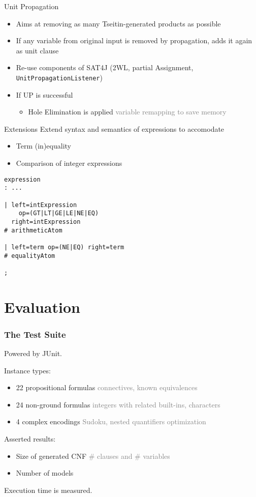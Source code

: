 \documentclass[smaller,dvipsnames,ratio=169]{beamer}
\begin{document}
  \begin{frame}{Unit Propagation}
    \begin{itemize}
      \item Aims at removing as many Tseitin-generated products as possible
      \item If any variable from original input is removed by propagation, adds it again as unit clause
      \item Re-use components of SAT4J (2WL, partial Assignment, \texttt{UnitPropagationListener})
      \item If UP is successful
       \begin{itemize}
       	\item  \alert{Hole Elimination} is applied \textcolor{gray}{variable remapping to save memory}
       \end{itemize}
        
    \end{itemize}
  \end{frame}
  
  \begin{frame}[fragile]{Extensions}
    Extend syntax and semantics of expressions to accomodate
    \begin{itemize}
      \item Term (in)\alert{equality}
      \item \alert{Comparison} of integer expressions
    \end{itemize}
    \begin{verbatim}
expression
: ...

| left=intExpression
    op=(GT|LT|GE|LE|NE|EQ)
  right=intExpression
# arithmeticAtom

| left=term op=(NE|EQ) right=term
# equalityAtom

;
    \end{verbatim}
\end{frame}

  \section{Evaluation}

  \begin{frame}
    \frametitle{The Test Suite}
    Powered by \alert{JUnit}.

    Instance types:
    \begin{itemize}
      \item 22 propositional formulas \textcolor{gray}{connectives, known equivalences}
      \item 24 non-ground formulas \textcolor{gray}{integers with related built-ins, characters}
      \item 4 complex encodings \textcolor{gray}{Sudoku, nested quantifiers optimization}
    \end{itemize}
    Asserted results:
    \begin{itemize}
      \item \alert{Size} of generated CNF \textcolor{gray}{\# clauses and \# variables}
      \item Number of \alert{models}
    \end{itemize}
    Execution \alert{time} is measured.
  \end{frame}
\end{document}
